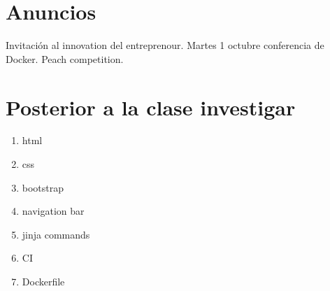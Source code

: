 \section{Anuncios}
Invitación al innovation del entreprenour. \newline 
Martes 1 octubre conferencia de Docker. \newline 
Peach competition.


\section{Posterior a la clase investigar}
\begin{enumerate}
    \item html
    \item css
    \item bootstrap 
    \item navigation bar 
    \item jinja commands
    \item CI 
    \item Dockerfile 
\end{enumerate}
